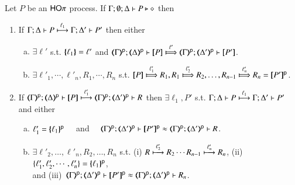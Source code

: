 \begin{proposition}\label{p:ocpotomo}
Let $P$ be an  $\HOp$ process.
If $\Gamma; \emptyset; \Delta \proves P \hastype \Proc$ then
		\begin{enumerate}[1.]
			\item	 
			   If  $\stytra{\Gamma}{\ell_1}{\Delta}{P}{\Delta'}{P'}$
			   then either
			   \begin{enumerate}[a)]
					\item $\exists \ell'$ s.t. 
					$\mapa{\ell_1} = \ell'$ and 
			    $\wtytra{\mapt{\Gamma}^{\mathsf{p}}}{\ell'}{\mapt{\Delta}^{\mathsf{p}}}{\map{P}}{\mapt{\Delta'}^{\mathsf{p}}}{\map{P'}}$.
			    
			    	\item $\exists \ell'_1, \cdots, \ell'_n, R_1, \cdots, R_n$ s.t.
				    $\map{P} \Hby{\ell'_1} R_1, R_1 \Hby{\ell'_2} R_2, \ldots, R_{n-1} \Hby{\ell'_n} R_n = \map{P'}^{\mathsf{p}}$.
					\end{enumerate}
			   
			   
			    
			\item   
			If  $\stytra{\mapt{\Gamma}^{\mathsf{p}}}{\ell'_1}{\mapt{\Delta}^{\mathsf{p}}}{\map{P}}{\mapt{\Delta'}^{\mathsf{p}}}{R}$
			   then 
			   $\exists \ell_1, P'$ s.t.  
			   $\stytra{\Gamma}{\ell_1}{\Delta}{P}{\Delta'}{P'}$
			   and 
			   either
			   		\begin{enumerate}[a)]
					\item   
			      $\ell'_1 = \mapa{\ell_1}^{\mathsf{p}}$ ~~and~~ 
			    $\wbb{\mapt{\Gamma}^{\mathsf{p}}}{\ell}{\mapt{\Delta'}^{\mathsf{p}}}{\map{P'}^{\mathsf{p}}}{\mapt{\Delta'}^{\mathsf{p}}}{R}$.
			   		
					\item $\exists \ell'_2, \ldots, \ell'_n, R_2, \ldots, R_n$ s.t. 
					(i) $R \hby{\ell'_2} R_2   \cdots  R_{n-1} \hby{\ell'_n} R_n$,  
					(ii)~$\{\ell'_1, \ell'_2, \cdots, \ell'_n\} = \mapa{\ell_1}^{\mathsf{p}}$, \\ and 
					(iii)~$\wbb{\mapt{\Gamma}^{\mathsf{p}}}{\ell}{\mapt{\Delta'}^{\mathsf{p}}}{\map{P'}^{\mathsf{p}}}{\mapt{\Delta'}^{\mathsf{p}}}{R_n}$.
					\end{enumerate}




			    \end{enumerate}
\end{proposition}

